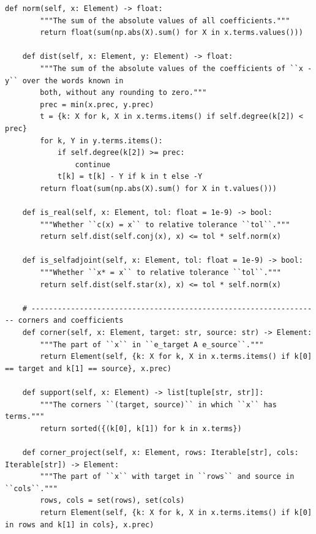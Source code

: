 \documentclass[12pt, a4paper]{report}
\theoremstyle{plain}
\theoremstyle{definition}
\theoremstyle{remark}
\theoremstyle{plain}
\begin{document}
\begin{lstlisting}[style=dsqcode]
    def norm(self, x: Element) -> float:
        """The sum of the absolute values of all coefficients."""
        return float(sum(np.abs(X).sum() for X in x.terms.values()))

    def dist(self, x: Element, y: Element) -> float:
        """The sum of the absolute values of the coefficients of ``x - y`` over the words known in
        both, without any rounding to zero."""
        prec = min(x.prec, y.prec)
        t = {k: X for k, X in x.terms.items() if self.degree(k[2]) < prec}
        for k, Y in y.terms.items():
            if self.degree(k[2]) >= prec:
                continue
            t[k] = t[k] - Y if k in t else -Y
        return float(sum(np.abs(X).sum() for X in t.values()))

    def is_real(self, x: Element, tol: float = 1e-9) -> bool:
        """Whether ``c(x) = x`` to relative tolerance ``tol``."""
        return self.dist(self.conj(x), x) <= tol * self.norm(x)

    def is_selfadjoint(self, x: Element, tol: float = 1e-9) -> bool:
        """Whether ``x* = x`` to relative tolerance ``tol``."""
        return self.dist(self.star(x), x) <= tol * self.norm(x)

    # ------------------------------------------------------------------ corners and coefficients
    def corner(self, x: Element, target: str, source: str) -> Element:
        """The part of ``x`` in ``e_target A e_source``."""
        return Element(self, {k: X for k, X in x.terms.items() if k[0] == target and k[1] == source}, x.prec)

    def support(self, x: Element) -> list[tuple[str, str]]:
        """The corners ``(target, source)`` in which ``x`` has terms."""
        return sorted({(k[0], k[1]) for k in x.terms})

    def corner_project(self, x: Element, rows: Iterable[str], cols: Iterable[str]) -> Element:
        """The part of ``x`` with target in ``rows`` and source in ``cols``."""
        rows, cols = set(rows), set(cols)
        return Element(self, {k: X for k, X in x.terms.items() if k[0] in rows and k[1] in cols}, x.prec)


\end{lstlisting}
\end{document}
